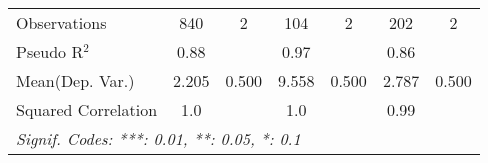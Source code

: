 \begin{tabular}{lcccccc}
   Observations                                               & 840           & 2    & 104            & 2    & 202           & 2\\  
   Pseudo R$^2$                                               & 0.88          &      & 0.97           &      & 0.86          & \\  
Mean(Dep. Var.) & 2.205 & 0.500 & 9.558 & 0.500 & 2.787 & 0.500 \\
   Squared Correlation                                        & 1.0           &      & 1.0            &      & 0.99          & \\  
   \midrule \midrule
   \multicolumn{7}{l}{\emph{Signif. Codes: ***: 0.01, **: 0.05, *: 0.1}}\\
\end{tabular}
\par\endgroup
